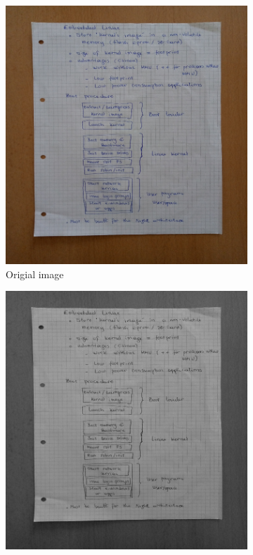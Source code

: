 \documentclass{scrartcl}
\begin{document}
  \begin{figure}[!htbp]
    \centering
    \begin{subfigure}[b]{0.3\textwidth}
      \centering
      \includegraphics[width=\textwidth]{pictures/results/reference1/original.png}
      \caption{Origial image}
    \end{subfigure}
    \begin{subfigure}[b]{0.3\textwidth}
      \centering
      \includegraphics[width=\textwidth]{pictures/results/reference1/grayscale.png}

\end{subfigure}
\end{figure}
\end{document}
